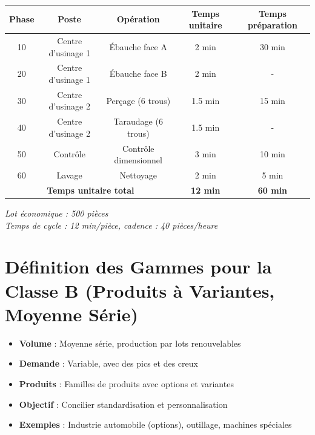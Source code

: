 \documentclass{article}
\begin{document}
\begin{tcolorbox}[colback=gray!5!white, colframe=gray!75!black, title=Gamme simplifiée - Carter moteur (grande série)]
\begin{center}
\begin{tabular}{|c|c|c|c|c|}
\hline
\textbf{Phase} & \textbf{Poste} & \textbf{Opération} & \textbf{Temps unitaire} & \textbf{Temps préparation} \\
\hline
10 & Centre d'usinage 1 & Ébauche face A & 2 min & 30 min \\
20 & Centre d'usinage 1 & Ébauche face B & 2 min & - \\
30 & Centre d'usinage 2 & Perçage (6 trous) & 1.5 min & 15 min \\
40 & Centre d'usinage 2 & Taraudage (6 trous) & 1.5 min & - \\
50 & Contrôle & Contrôle dimensionnel & 3 min & 10 min \\
60 & Lavage & Nettoyage & 2 min & 5 min \\
\hline
\multicolumn{3}{|c|}{\textbf{Temps unitaire total}} & \textbf{12 min} & \textbf{60 min} \\
\hline
\end{tabular}
\vspace{0.5em}

\textit{Lot économique : 500 pièces}\\
\textit{Temps de cycle : 12 min/pièce, cadence : 40 pièces/heure}
\end{center}
\end{tcolorbox}

\section{Définition des Gammes pour la Classe B (Produits à Variantes, Moyenne Série)}

\begin{tcolorbox}[colback=blueclair, colframe=blue!70!black, title=Caractéristiques de la Classe B]
\begin{itemize}
    \item \textbf{Volume} : Moyenne série, production par lots renouvelables
    \item \textbf{Demande} : Variable, avec des pics et des creux
    \item \textbf{Produits} : Familles de produits avec options et variantes
    \item \textbf{Objectif} : Concilier standardisation et personnalisation
    \item \textbf{Exemples} : Industrie automobile (options), outillage, machines spéciales
\end{itemize}
\end{tcolorbox}
\end{document}
